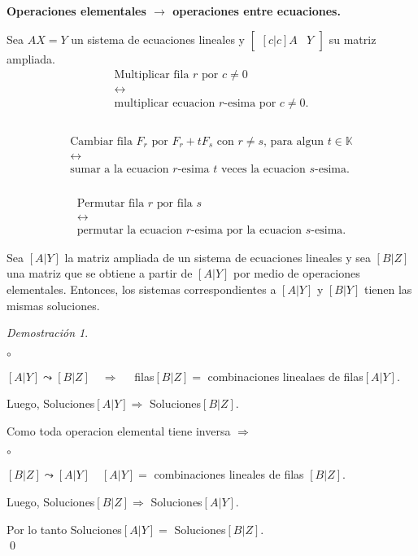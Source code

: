 \documentclass{article}
\theoremstyle{definition}
\theoremstyle{definition}
\theoremstyle{remark}
\newtheorem*{demo}{Demostración}
\begin{document}
\begin{center} \pagebreak

\textbf{Operaciones elementales $\longrightarrow$ operaciones entre ecuaciones.}
\end{center}
Sea $AX=Y$ un sistema de ecuaciones lineales y $\begin{bmatrix}[c|c] A & Y \end{bmatrix}$ su matriz ampliada. 
\begin{equation} \tag{E1}
\begin{gathered}
  \text{Multiplicar fila }r \text{ por }c \neq 0 \\
\longleftrightarrow\\
\text{multiplicar ecuacion }r\text{-esima por }c \neq 0.\\
\end{gathered}
\end{equation}
\\
\begin{equation} \tag{E2}
\begin{gathered}
  \text{Cambiar fila } F_r \text{ por } F_{r}+tF_{s} \text{ con } r \neq s\text{, para algun }t \in \mathbb{K} \\
\longleftrightarrow\\
\text{sumar a la ecuacion }r\text{-esima }t \text{ veces la ecuacion }s\text{-esima}.\\
\end{gathered}
\end{equation}
\\
\begin{equation} \tag{E3}
\begin{gathered}
\text{Permutar fila }r\text{ por fila } s\\
\longleftrightarrow\\
\text{permutar la ecuacion } r\text{-esima por la ecuacion } s\text{-esima.}
\end{gathered}
\end{equation}
\begin{teo}
  Sea $[A|Y]$ la matriz ampliada de un sistema de ecuaciones lineales y sea $[B|Z]$ una matriz que se obtiene a partir de $[A|Y]$ por medio de operaciones elementales. Entonces, los sistemas correspondientes a $[A|Y]$ y $[B|Y]$ tienen las mismas soluciones.
\end{teo}
\begin{demo}\;
\begin{list}{$\circ$}{}  
\item  $[A|Y] \leadsto [B|Z] \quad \Rightarrow \quad$ filas$[B|Z] =$ combinaciones linealaes de filas$[A|Y]$. 
\item Luego, Soluciones$[A|Y] \Rightarrow $ Soluciones$[B|Z]$.
\end{list}
Como toda operacion elemental tiene inversa $\Rightarrow$
\begin{list}{$\circ$}{}  
\item  $[B|Z] \leadsto [A|Y] \quad [A|Y] =$ combinaciones lineales de filas $[B|Z]$.
\item Luego, Soluciones$[B|Z] \Rightarrow$ Soluciones$[A|Y]$.
\end{list}
Por lo tanto Soluciones$[A|Y]=$ Soluciones$[B|Z]$.\\ \qed
\end{demo}
\end{document}

